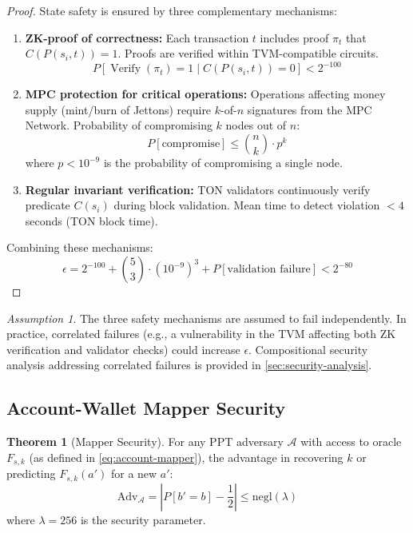 \documentclass[12pt,a4paper]{article}
\theoremstyle{definition}
\newtheorem{theorem}{Theorem}[section]
\theoremstyle{remark}
\newtheorem{assumption}{Assumption}[section]
\DeclareMathOperator{\Verify}{Verify}
\begin{document}
\begin{proof}
State safety is ensured by three complementary mechanisms:

\begin{enumerate}
    \item \textbf{ZK-proof of correctness:} Each transaction $t$ includes proof $\pi_t$ that $C(P(s_i, t)) = 1$. Proofs are verified within TVM-compatible circuits.
    \begin{equation}
    P[\Verify(\pi_t) = 1 \mid C(P(s_i, t)) = 0] < 2^{-100}
    \end{equation}
    
    \item \textbf{MPC protection for critical operations:} Operations affecting money supply (mint/burn of Jettons) require $k$-of-$n$ signatures from the MPC Network. Probability of compromising $k$ nodes out of $n$:
    \begin{equation}
    P[\text{compromise}] \leq \binom{n}{k} \cdot p^k
    \end{equation}
    where $p < 10^{-9}$ is the probability of compromising a single node.
    
    \item \textbf{Regular invariant verification:} TON validators continuously verify predicate $C(s_i)$ during block validation. Mean time to detect violation $< 4$ seconds (TON block time).
\end{enumerate}

Combining these mechanisms:
\begin{equation}
\epsilon = 2^{-100} + \binom{5}{3} \cdot (10^{-9})^3 + P[\text{validation failure}] < 2^{-80}
\end{equation}
\end{proof}

\begin{assumption}
\label{asm:independence}
The three safety mechanisms are assumed to fail independently. In practice, correlated failures (e.g., a vulnerability in the TVM affecting both ZK verification and validator checks) could increase $\epsilon$. Compositional security analysis addressing correlated failures is provided in \cref{sec:security-analysis}.
\end{assumption}

\subsection{Account-Wallet Mapper Security}

\begin{theorem}[Mapper Security]
\label{thm:mapper-security}
For any PPT adversary $\mathcal{A}$ with access to oracle $F_{s,k}$ (as defined in \cref{eq:account-mapper}), the advantage in recovering $k$ or predicting $F_{s,k}(a')$ for a new $a'$:
\begin{equation}
\mathrm{Adv}_{\mathcal{A}} = \left| P[b' = b] - \frac{1}{2} \right| \leq \mathrm{negl}(\lambda)
\end{equation}
where $\lambda = 256$ is the security parameter.
\end{theorem}
\end{document}
